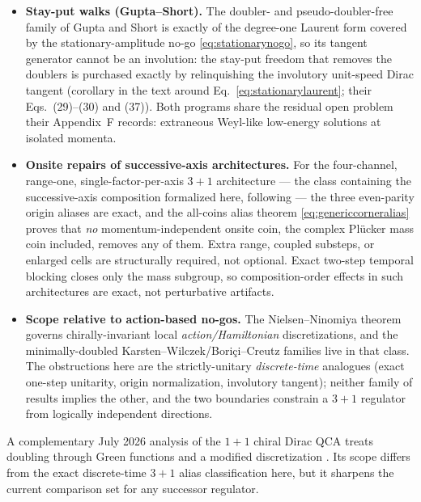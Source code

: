 \documentclass[11pt]{article}
\begin{document}
\begin{itemize}[leftmargin=2em]
  \item \textbf{Stay-put walks (Gupta--Short).}  The doubler- and
  pseudo-doubler-free family of Gupta and Short
  \cite{GuptaShortDoubling} is exactly of the degree-one Laurent form
  covered by the stationary-amplitude no-go
  \eqref{eq:stationarynogo}, so its tangent generator cannot be an
  involution: the stay-put freedom that removes the doublers is
  purchased exactly by relinquishing the involutory unit-speed Dirac
  tangent (corollary in the text around
  Eq.~\eqref{eq:stationarylaurent}; their Eqs.~(29)--(30) and (37)).
  Both programs share the residual open problem their Appendix~F
  records: extraneous Weyl-like low-energy solutions at isolated
  momenta.
  \item \textbf{Onsite repairs of successive-axis architectures.}  For
  the four-channel, range-one, single-factor-per-axis $3+1$
  architecture --- the class containing the successive-axis composition
  formalized here, following \cite{MlodinowBrun} --- the three
  even-parity origin aliases are exact, and the all-coins alias theorem
  \eqref{eq:genericcorneralias} proves that \emph{no} momentum-independent
  onsite coin, the complex Pl\"ucker mass coin included, removes any of
  them.  Extra range, coupled substeps, or enlarged cells are
  structurally required, not optional.  Exact two-step temporal
  blocking closes only the mass subgroup, so composition-order effects
  in such architectures are exact, not perturbative artifacts.
  \item \textbf{Scope relative to action-based no-gos.}  The
  Nielsen--Ninomiya theorem \cite{NielsenNinomiya} governs
  chirally-invariant local \emph{action/Hamiltonian} discretizations,
  and the minimally-doubled Karsten--Wilczek/Bori\c{c}i--Creutz families
  live in that class.  The obstructions here are the strictly-unitary
  \emph{discrete-time} analogues (exact one-step unitarity, origin
  normalization, involutory tangent); neither family of results implies
  the other, and the two boundaries constrain a $3+1$ regulator from
  logically independent directions.
\end{itemize}

A complementary July 2026 analysis of the $1+1$ chiral Dirac QCA treats
doubling through Green functions and a modified discretization
\cite{BakirciogluArnault2026}.  Its scope differs from the exact discrete-time
$3+1$ alias classification here, but it sharpens the current comparison set
for any successor regulator.
\end{document}
